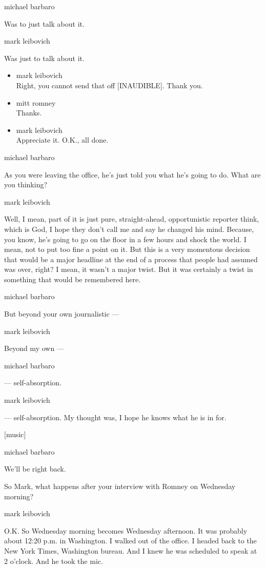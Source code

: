 michael barbaro

Was to just talk about it.

mark leibovich

Was just to talk about it.

\begin{itemize}
\item
  mark leibovich\\
  Right, you cannot send that off {[}INAUDIBLE{]}. Thank you.
\item
  mitt romney\\
  Thanks.
\item
  mark leibovich\\
  Appreciate it. O.K., all done.
\end{itemize}

michael barbaro

As you were leaving the office, he's just told you what he's going to
do. What are you thinking?

mark leibovich

Well, I mean, part of it is just pure, straight-ahead, opportunistic
reporter think, which is God, I hope they don't call me and say he
changed his mind. Because, you know, he's going to go on the floor in a
few hours and shock the world. I mean, not to put too fine a point on
it. But this is a very momentous decision that would be a major headline
at the end of a process that people had assumed was over, right? I mean,
it wasn't a major twist. But it was certainly a twist in something that
would be remembered here.

michael barbaro

But beyond your own journalistic ---

mark leibovich

Beyond my own ---

michael barbaro

--- self-absorption.

mark leibovich

--- self-absorption. My thought was, I hope he knows what he is in for.

{[}music{]}

michael barbaro

We'll be right back.

So Mark, what happens after your interview with Romney on Wednesday
morning?

mark leibovich

O.K. So Wednesday morning becomes Wednesday afternoon. It was probably
about 12:20 p.m. in Washington. I walked out of the office. I headed
back to the New York Times, Washington bureau. And I knew he was
scheduled to speak at 2 o'clock. And he took the mic.

